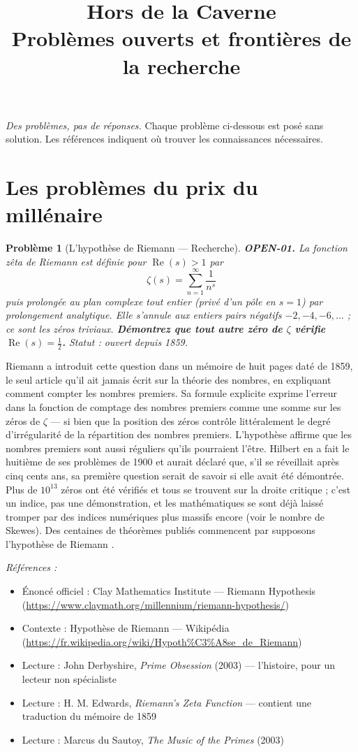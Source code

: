 \documentclass[11pt]{article}
\title{Hors de la Caverne \\ \Large Problèmes ouverts et frontières de la recherche}
\author{}
\date{}
\newtheorem{problem}{Problème}
\newenvironment{refs}{\par\small\noindent\emph{Références :}\begin{itemize}\setlength\itemsep{0pt}}{\end{itemize}\normalsize}
\begin{document}
\maketitle
\noindent\emph{Des problèmes, pas de réponses.} Chaque problème ci-dessous est posé
sans solution. Les références indiquent où trouver les connaissances nécessaires.
\medskip


\section*{Les problèmes du prix du millénaire}

\begin{problem}[{L'hypothèse de Riemann --- Recherche}]
\textbf{OPEN-01.} La fonction zêta de Riemann est définie pour
$ \operatorname{Re}(s) > 1 $ par
\[ \zeta(s) = \sum_{n=1}^{\infty} \frac{1}{n^s} \]
puis prolongée au plan complexe tout entier (privé d'un pôle en $ s = 1 $) par
prolongement analytique. Elle s'annule aux entiers pairs négatifs $ -2, -4, -6, \dots $ ;
ce sont les zéros triviaux. \textbf{Démontrez que tout autre zéro de $ \zeta $ vérifie
$ \operatorname{Re}(s) = \tfrac{1}{2} $.} Statut : ouvert depuis 1859.
\end{problem}

\noindent Riemann a introduit cette question dans un mémoire de huit pages daté
de 1859, le seul article qu'il ait jamais écrit sur la théorie des nombres, en expliquant
comment compter les nombres premiers. Sa formule explicite exprime l'erreur dans la
fonction de comptage des nombres premiers comme une somme sur les zéros de $ \zeta $ ---
si bien que la position des zéros contrôle littéralement le degré d'irrégularité de la
répartition des nombres premiers. L'hypothèse affirme que les nombres premiers sont aussi
réguliers qu'ils pourraient l'être. Hilbert en a fait le huitième de ses problèmes de 1900
et aurait déclaré que, s'il se réveillait après cinq cents ans, sa première question serait
de savoir si elle avait été démontrée. Plus de $ 10^{13} $ zéros ont été vérifiés et tous
se trouvent sur la droite critique ; c'est un indice, pas une démonstration, et les
mathématiques se sont déjà laissé tromper par des indices numériques plus massifs encore
(voir le nombre de Skewes). Des centaines de théorèmes publiés commencent par \og{} supposons
l'hypothèse de Riemann \fg{}.

\begin{refs}
\item Énoncé officiel : Clay Mathematics Institute --- Riemann Hypothesis (\url{https://www.claymath.org/millennium/riemann-hypothesis/})
\item Contexte : Hypothèse de Riemann --- Wikipédia (\url{https://fr.wikipedia.org/wiki/Hypoth%C3%A8se_de_Riemann})
\item Lecture : John Derbyshire, \textit{Prime Obsession} (2003) --- l'histoire, pour un lecteur non spécialiste
\item Lecture : H. M. Edwards, \textit{Riemann's Zeta Function} --- contient une traduction du mémoire de 1859
\item Lecture : Marcus du Sautoy, \textit{The Music of the Primes} (2003)
\end{refs}
\end{document}

